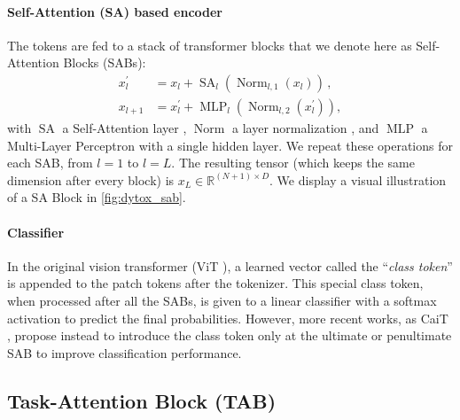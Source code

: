 \paragraph{Self-Attention (SA) based encoder}The tokens are fed to a stack of transformer blocks
that we denote here as Self-Attention Blocks (SABs):
\begin{equation}
    \begin{aligned}
        x_{l}^{\prime} & =x_{l}+\operatorname{SA}_l\left(\operatorname{Norm}_{l,1}\left(x_{l}\right)\right)\,,                  \\
        x_{l+1}        & =x_{l}^{\prime}+\operatorname{MLP}_l\left(\operatorname{Norm}_{l,2}\left(x_{l}^{\prime}\right)\right),
    \end{aligned}
    \label{eq:dytox_sa_block}
\end{equation}
with $\operatorname{SA}$ a Self-Attention layer \cite{vaswani2017transformer}, $\operatorname{Norm}$
a layer normalization \cite{ba2016layernorm}, and $\operatorname{MLP}$ a Multi-Layer Perceptron with
a single hidden layer. We repeat these operations for each SAB, from $l=1$ to $l=L$. The resulting
tensor (which keeps the same dimension after every block) is $x_{L} \in \mathbb{R}^{(N+1) \times
        D}$. We display a visual illustration of a SA Block in \autoref{fig:dytox_sab}.


\paragraph{Classifier} In the original vision transformer (ViT \cite{dosovitskiy2020vit}), a learned
vector called the ``\textit{class token}'' is appended to the patch tokens after the tokenizer. This
special class token, when processed after all the SABs, is given to a linear classifier with a
softmax activation to predict the final probabilities. However, more recent works, as CaiT
\cite{touvron2021cait}, propose instead to introduce the class token only at the ultimate or
penultimate SAB to improve classification performance.

\subsection{Task-Attention Block (TAB)}
\label{sec:dytox_tab}

